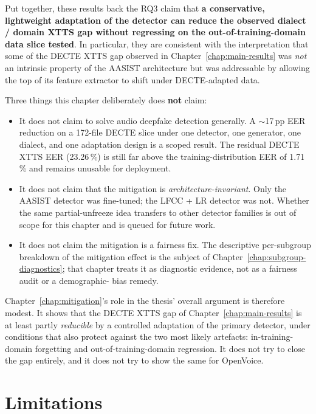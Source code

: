 Put together, these results back the RQ3 claim that \textbf{a
conservative, lightweight adaptation of the detector can reduce
the observed dialect / domain XTTS gap without regressing on
the out-of-training-domain data slice tested}. In particular,
they are consistent with the interpretation that some of the
DECTE XTTS gap observed in Chapter~\ref{chap:main-results} was \emph{not} an intrinsic
property of the AASIST architecture but was addressable by
allowing the top of its feature extractor to shift under
DECTE-adapted data.

Three things this chapter deliberately does \textbf{not} claim:

\begin{itemize}
    \item It does not claim to solve audio deepfake detection generally.
        A $\sim$17\,pp EER reduction on a 172-file DECTE slice under one
        detector, one generator, one dialect, and one adaptation
        design is a scoped result. The residual DECTE XTTS EER
        (23.26\,\%) is still far above the training-distribution EER of
        1.71\,\% and remains unusable for deployment.
    \item It does not claim that the mitigation is \emph{architecture-invariant}.
        Only the AASIST detector was fine-tuned; the LFCC + LR
        detector was not. Whether the same partial-unfreeze idea
        transfers to other detector families is out of scope for this
        chapter and is queued for future work.
    \item It does not claim the mitigation is a fairness fix. The
        descriptive per-subgroup breakdown of the mitigation effect
        is the subject of Chapter~\ref{chap:subgroup-diagnostics}; that chapter treats it as
        diagnostic evidence, not as a fairness audit or a demographic-%
        bias remedy.
\end{itemize}

Chapter~\ref{chap:mitigation}'s role in the thesis' overall argument is therefore
modest. It shows that the DECTE XTTS gap of Chapter~\ref{chap:main-results} is at
least partly \emph{reducible} by a controlled adaptation of the
primary detector, under conditions that also protect against
the two most likely artefacts: in-training-domain forgetting
and out-of-training-domain regression. It does not try to close
the gap entirely, and it does not try to show the same for
OpenVoice.


\section{Limitations}
\label{sec:mitigation-limitations}


